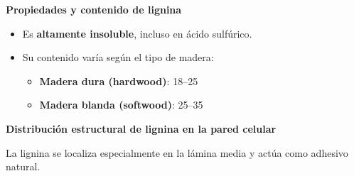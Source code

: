 \documentclass[../../main.tex]{subfiles}
\begin{document}
\begin{frame}{\textbf{Propiedades y contenido de lignina}}
\begin{itemize}
  \item Es \textbf{altamente insoluble}, incluso en ácido sulfúrico.
  \item Su contenido varía según el tipo de madera:
  \begin{itemize}
    \item \textbf{Madera dura (hardwood)}: 18–25 %
    \item \textbf{Madera blanda (softwood)}: 25–35 %
  \end{itemize}
\end{itemize}
\textbf{Distribución estructural de lignina en la pared celular}
\centering
{}

\vspace{0.5em}
\small La lignina se localiza especialmente en la lámina media y actúa como adhesivo natural.
\end{frame}
\end{document}
